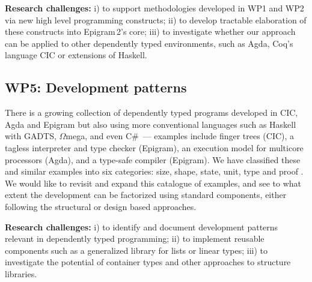 \documentclass[a4paper]{article}
\begin{document}
\textbf{Research challenges:} i) to support methodologies developed in
WP1 and WP2 via new high level programming constructs; ii) to develop
tractable elaboration of these constructs into Epigram\,2's core; iii)
to investigate whether our approach can be applied to other
dependently typed environments, such as Agda, Coq's language CIC or
extensions of Haskell.





\subsection*{WP5: Development patterns}
\label{sec:development-patterns}

There is a growing collection of dependently typed programs developed
in CIC, Agda and Epigram but also using more conventional languages
such as Haskell with GADTS, $\Omega$mega, and even C\#~\cite{kennedy:csharp}--- examples include
finger trees (CIC),
a tagless interpreter and type checker (Epigram),
an execution model for multicore processors (Agda),
and a type-safe compiler (Epigram).
We have classified these and similar
examples into six categories: size, shape, state, unit, type and proof
\cite{Gibbons*2007:Generic}.
We would like to revisit and expand this catalogue of examples, and see to what
extent the development can be factorized using standard components,
either following the structural or design based approaches. 

\textbf{Research challenges:} i) to identify and document development
patterns relevant in dependently typed programming; ii) to implement
reusable components such as a generalized library for lists or linear
types; iii) to investigate the potential of container types and other
approaches to structure libraries.


\end{document}
